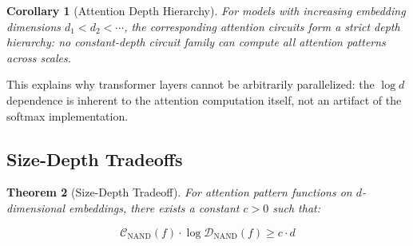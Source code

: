 \documentclass[11pt]{article}
\newtheorem{theorem}{Theorem}[section]
\newtheorem{corollary}[theorem]{Corollary}
\theoremstyle{definition}
\begin{document}
\begin{corollary}[Attention Depth Hierarchy]






For models with increasing embedding dimensions $d_1 < d_2 < \cdots$, the corresponding attention circuits form a strict depth hierarchy: no constant-depth circuit family can compute all attention patterns across scales.






\end{corollary}













This explains why transformer layers cannot be arbitrarily parallelized: the $\log d$ dependence is inherent to the attention computation itself, not an artifact of the softmax implementation.













\subsection{Size-Depth Tradeoffs}













\begin{theorem}[Size-Depth Tradeoff]






For attention pattern functions on $d$-dimensional embeddings, there exists a constant $c > 0$ such that:






\[






\mathcal{C}_{\text{NAND}}(f) \cdot \log \mathcal{D}_{\text{NAND}}(f) \geq c \cdot d






\]






\end{theorem}
\end{document}

